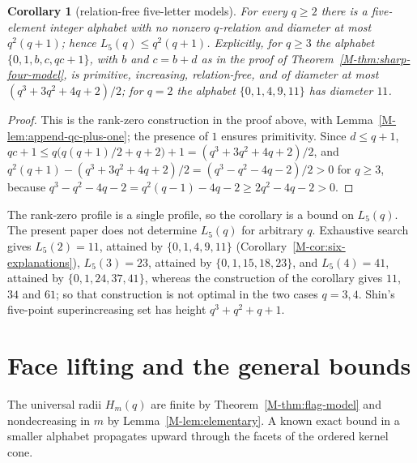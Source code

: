 \documentclass[11pt,reqno]{amsart}
\theoremstyle{plain}
\newtheorem{corollary}[theorem]{Corollary}
\theoremstyle{definition}
\theoremstyle{plain}
\theoremstyle{plain}
\theoremstyle{plain}
\theoremstyle{plain}
\theoremstyle{plain}
\theoremstyle{plain}
\theoremstyle{definition}
\theoremstyle{definition}
\theoremstyle{definition}
\theoremstyle{plain}
\begin{document}
\begin{corollary}[relation-free five-letter models]\label{M-cor:five-rank-zero}
For every $q\ge2$ there is a five-element integer alphabet with no nonzero
$q$-relation and diameter at most $q^2(q+1)$; hence $L_5(q)\le q^2(q+1)$.
Explicitly, for $q\ge3$ the alphabet $\{0,1,b,c,qc+1\}$, with $b$ and $c=b+d$ as in
the proof of Theorem~\ref{M-thm:sharp-four-model}, is primitive, increasing,
relation-free, and of diameter at most $(q^3+3q^2+4q+2)/2$; for $q=2$ the
alphabet $\{0,1,4,9,11\}$ has diameter $11$.
\end{corollary}
\begin{proof}
This is the rank-zero construction in the proof above, with
Lemma~\ref{M-lem:append-qc-plus-one}; the presence of $1$ ensures
primitivity. Since $d\le q+1$,
$qc+1\le q\bigl(q(q+1)/2+q+2\bigr)+1=(q^3+3q^2+4q+2)/2$, and
$q^2(q+1)-(q^3+3q^2+4q+2)/2=(q^3-q^2-4q-2)/2>0$ for $q\ge3$, because
$q^3-q^2-4q-2=q^2(q-1)-4q-2\ge2q^2-4q-2>0$.
\end{proof}

The rank-zero profile is a single profile, so the corollary is a bound on
$L_5(q)$. The present paper does not determine $L_5(q)$ for arbitrary $q$. Exhaustive search
 gives $L_5(2)=11$, attained by
$\{0,1,4,9,11\}$ (Corollary~\ref{M-cor:six-explanations}), $L_5(3)=23$,
attained by $\{0,1,15,18,23\}$, and $L_5(4)=41$, attained by
$\{0,1,24,37,41\}$, whereas the construction of the corollary gives $11$,
$34$ and $61$; so that construction is not optimal in the two cases $q=3,4$.
Shin's five-point superincreasing set \cite[Corollary~7.4]{M-Shin26} has
height $q^3+q^2+q+1$.

\section{Face lifting and the general bounds}\label{M-sec:lifting}

The universal radii $H_m(q)$ are finite by Theorem~\ref{M-thm:flag-model} and
nondecreasing in $m$ by Lemma~\ref{M-lem:elementary}. A known exact bound in a
smaller alphabet propagates upward through the facets of the ordered kernel
cone.
\end{document}
